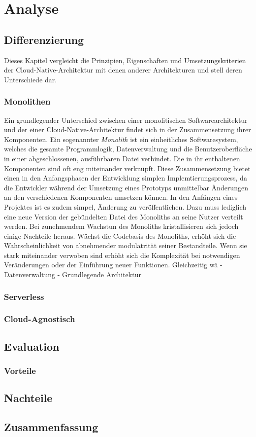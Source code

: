 \chapter{Analyse}
\label{ch:analyse}

\section{Differenzierung}

Dieses Kapitel vergleicht die Prinzipien, Eigenschaften und Umsetzungskriterien der Cloud-Native-Architektur mit denen anderer Architekturen und stell deren Unterschiede dar.

\subsection{Monolithen}

Ein grundlegender Unterschied zwischen einer monolitischen Softwarearchitektur und der einer Cloud-Native-Architektur findet sich in der Zusammensetzung ihrer Komponenten. Ein sogenannter \textit{Monolith} ist ein einheitliches Softwaresystem, welches die gesamte Programmlogik, Datenverwaltung und die Benutzeroberfläche in einer abgeschlossenen, ausführbaren Datei verbindet. Die in ihr enthaltenen Komponenten sind oft eng miteinander verknüpft. Diese Zusammensetzung bietet einen in den Anfangsphasen der Entwicklung simplen Implemtierungsprozess, da die Entwickler während der Umsetzung eines Prototyps unmittelbar Änderungen an den verschiedenen Komponenten umsetzen können. In den Anfängen eines Projektes ist es zudem simpel, Änderung zu veröffentlichen. Dazu muss lediglich eine neue Version der gebündelten Datei des Monoliths an seine Nutzer verteilt werden. Bei zunehmendem Wachstun des Monoliths kristallisieren sich jedoch einige Nachteile heraus. Wächst die Codebasis des Monoliths, erhöht sich die Wahrscheinlichkeit von abnehmender modulatrität seiner Bestandteile. Wenn sie stark miteinander verwoben sind erhöht sich die Komplexität bei notwendigen Veränderungen oder der Einführung neuer Funktionen. Gleichzeitig wä
- Datenverwaltung
- Grundlegende Architektur


\subsection{Serverless}

\subsection{Cloud-Agnostisch}

\section{Evaluation}

\subsection{Vorteile}

\section{Nachteile}

\section{Zusammenfassung}